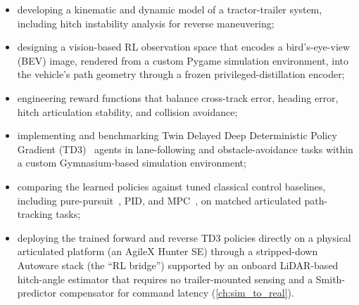 \begin{itemize}
    \item developing a kinematic and dynamic model of a tractor-trailer system, including hitch instability analysis for reverse maneuvering;
    \item designing a vision-based RL observation space that encodes a bird's-eye-view (BEV) image, rendered from a custom Pygame simulation environment, into the vehicle's path geometry through a frozen privileged-distillation encoder;
    \item engineering reward functions that balance cross-track error, heading error, hitch articulation stability, and collision avoidance;
    \item implementing and benchmarking Twin Delayed Deep Deterministic Policy Gradient (TD3)~\cite{fujimoto2018td3} agents in lane-following and obstacle-avoidance tasks within a custom Gymnasium-based simulation environment;
    \item comparing the learned policies against tuned classical control baselines, including pure-pursuit~\cite{coulter1992pure}, PID, and MPC~\cite{rawlings2017mpc}, on matched articulated path-tracking tasks;
    \item deploying the trained forward and reverse TD3 policies directly on a physical articulated platform (an AgileX Hunter SE) through a stripped-down Autoware stack (the ``RL bridge'') supported by an onboard LiDAR-based hitch-angle estimator that requires no trailer-mounted sensing and a Smith-predictor compensator for command latency (\cref{ch:sim_to_real}).
\end{itemize}
